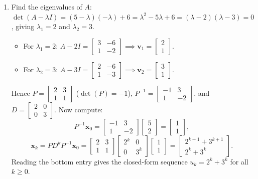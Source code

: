 \documentclass[11pt, letterpaper]{article}
\theoremstyle{definition}
\theoremstyle{remark}
\begin{document}
\begin{enumerate}[label=(\alph*)]
    \item Find the eigenvalues of $A$: $\det(A - \lambda I) = (5 - \lambda)(-\lambda) + 6 = \lambda^{2} - 5\lambda + 6 = (\lambda - 2)(\lambda - 3) = 0$, giving $\lambda_{1} = 2$ and $\lambda_{2} = 3$.
    \begin{itemize}
        \item For $\lambda_{1} = 2$: $A - 2I = \begin{bmatrix} 3 & -6 \\ 1 & -2 \end{bmatrix} \implies \mathbf{v}_{1} = \begin{bmatrix} 2 \\ 1 \end{bmatrix}$.
        \item For $\lambda_{2} = 3$: $A - 3I = \begin{bmatrix} 2 & -6 \\ 1 & -3 \end{bmatrix} \implies \mathbf{v}_{2} = \begin{bmatrix} 3 \\ 1 \end{bmatrix}$.
    \end{itemize}
    Hence $P = \begin{bmatrix} 2 & 3 \\ 1 & 1 \end{bmatrix}$ ($\det(P) = -1$), $P^{-1} = \begin{bmatrix} -1 & 3 \\ 1 & -2 \end{bmatrix}$, and $D = \begin{bmatrix} 2 & 0 \\ 0 & 3 \end{bmatrix}$. Now compute:
    \[
    P^{-1}\mathbf{x}_{0} = \begin{bmatrix} -1 & 3 \\ 1 & -2 \end{bmatrix}\begin{bmatrix} 5 \\ 2 \end{bmatrix} = \begin{bmatrix} 1 \\ 1 \end{bmatrix},
    \]
    \[
    \mathbf{x}_{k} = PD^{k}P^{-1}\mathbf{x}_{0} = \begin{bmatrix} 2 & 3 \\ 1 & 1 \end{bmatrix}\begin{bmatrix} 2^{k} & 0 \\ 0 & 3^{k} \end{bmatrix}\begin{bmatrix} 1 \\ 1 \end{bmatrix} = \begin{bmatrix} 2^{k+1} + 3^{k+1} \\ 2^{k} + 3^{k} \end{bmatrix}.
    \]
    Reading the bottom entry gives the closed-form sequence $u_{k} = 2^{k} + 3^{k}$ for all $k \ge 0$.
\end{enumerate}
\end{document}
